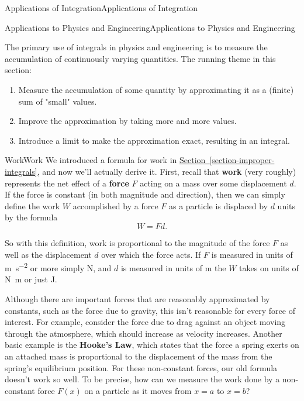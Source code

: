 \documentclass[10pt,]{book}
\newcommand{\terminology}[1]{\textbf{#1}}
\numberwithin{equation}{section}
\begin{document}
\begin{chapterptx}{Applications of Integration}{}{Applications of Integration}{}{}
\begin{sectionptx}{Applications to Physics and Engineering}{}{Applications to Physics and Engineering}{}{}
\begin{introduction}{}%
\hypertarget{p-676}{}%
The primary use of integrals in physics and engineering is to measure the accumulation of continuously varying quantities. The running theme in this section:%
\leavevmode%
\begin{enumerate}
\item\hypertarget{li-52}{}\hypertarget{p-677}{}%
Measure the accumulation of some quantity by approximating it as a (finite) sum of "small" values.%
\item\hypertarget{li-53}{}\hypertarget{p-678}{}%
Improve the approximation by taking more and more values.%
\item\hypertarget{li-54}{}\hypertarget{p-679}{}%
Introduce a limit to make the approximation exact, resulting in an integral.%
\end{enumerate}
\end{introduction}%
%
%
\typeout{************************************************}
\typeout{************************************************}
%
\begin{subsectionptx}{Work}{}{Work}{}{}\label{subsection-work}
\hypertarget{p-680}{}%
We introduced a formula for work in \hyperref[section-improper-integrals]{Section~\ref{section-improper-integrals}}, and now we'll actually derive it. First, recall that \terminology{work} (very roughly) represents the net effect of a \terminology{force} \(F\) acting on a mass over some displacement \(d\). If the force is constant (in both magnitude and direction), then we can simply define the work \(W\) accomplished by a force \(F\) as a particle is displaced by \(d\) units by the formula%
\begin{equation*}
W = Fd.
\end{equation*}
%
\par
\hypertarget{p-681}{}%
So with this definition, work is proportional to the magnitude of the force \(F\) as well as the displacement \(d\) over which the force acts. If \(F\) is measured in units of \si{\meter\per\second\tothe{2}} or more simply \si{\newton}, and \(d\) is measured in units of \si{\meter} the \(W\) takes on units of \si{\newton\meter} or just \si{\joule}.%
\par
\hypertarget{p-682}{}%
Although there are important forces that are reasonably approximated by constants, such as the force due to gravity, this isn't reasonable for every force of interest. For example, consider the force due to drag against an object moving through the atmosphere, which should increase as velocity increases. Another basic example is the \terminology{Hooke's Law}, which states that the force a spring exerts on an attached mass is proportional to the displacement of the mass from the spring's equilibrium position. For these non-constant forces, our old formula doesn't work so well. To be precise, how can we measure the work done by a non-constant force \(F(x)\) on a particle as it moves from \(x = a\) to \(x = b\)?%

\end{subsectionptx}
\end{sectionptx}
\end{chapterptx}
\end{document}
